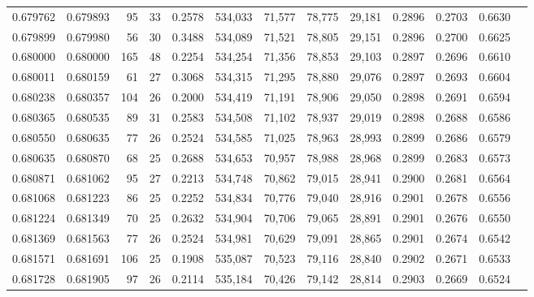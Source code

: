\begin{tabular}{rrrrrrrrrrrrr}
0.679762 & 0.679893 &     95 &    33 &                                     0.2578 & 534,033 &  71,577 &  78,775 &  29,181 & 0.2896 & 0.2703 & 0.6630 \\
0.679899 & 0.679980 &     56 &    30 &                                     0.3488 & 534,089 &  71,521 &  78,805 &  29,151 & 0.2896 & 0.2700 & 0.6625 \\
0.680000 & 0.680000 &    165 &    48 &                                     0.2254 & 534,254 &  71,356 &  78,853 &  29,103 & 0.2897 & 0.2696 & 0.6610 \\
0.680011 & 0.680159 &     61 &    27 &                                     0.3068 & 534,315 &  71,295 &  78,880 &  29,076 & 0.2897 & 0.2693 & 0.6604 \\
0.680238 & 0.680357 &    104 &    26 &                                     0.2000 & 534,419 &  71,191 &  78,906 &  29,050 & 0.2898 & 0.2691 & 0.6594 \\
0.680365 & 0.680535 &     89 &    31 &                                     0.2583 & 534,508 &  71,102 &  78,937 &  29,019 & 0.2898 & 0.2688 & 0.6586 \\
0.680550 & 0.680635 &     77 &    26 &                                     0.2524 & 534,585 &  71,025 &  78,963 &  28,993 & 0.2899 & 0.2686 & 0.6579 \\
0.680635 & 0.680870 &     68 &    25 &                                     0.2688 & 534,653 &  70,957 &  78,988 &  28,968 & 0.2899 & 0.2683 & 0.6573 \\
0.680871 & 0.681062 &     95 &    27 &                                     0.2213 & 534,748 &  70,862 &  79,015 &  28,941 & 0.2900 & 0.2681 & 0.6564 \\
0.681068 & 0.681223 &     86 &    25 &                                     0.2252 & 534,834 &  70,776 &  79,040 &  28,916 & 0.2901 & 0.2678 & 0.6556 \\
0.681224 & 0.681349 &     70 &    25 &                                     0.2632 & 534,904 &  70,706 &  79,065 &  28,891 & 0.2901 & 0.2676 & 0.6550 \\
0.681369 & 0.681563 &     77 &    26 &                                     0.2524 & 534,981 &  70,629 &  79,091 &  28,865 & 0.2901 & 0.2674 & 0.6542 \\
0.681571 & 0.681691 &    106 &    25 &                                     0.1908 & 535,087 &  70,523 &  79,116 &  28,840 & 0.2902 & 0.2671 & 0.6533 \\
0.681728 & 0.681905 &     97 &    26 &                                     0.2114 & 535,184 &  70,426 &  79,142 &  28,814 & 0.2903 & 0.2669 & 0.6524 \\

\end{tabular}

